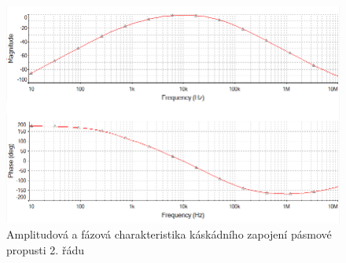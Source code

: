 \documentclass[twoside]{article}
\begin{document}
\begin{figure}[H]
\centering
\includegraphics[scale=0.75]{lrcbandpassampl.png}
\caption{Amplitudová a fázová charakteristika káskádního zapojení pásmové propusti 2. řádu}
\end{figure}
\end{document}
